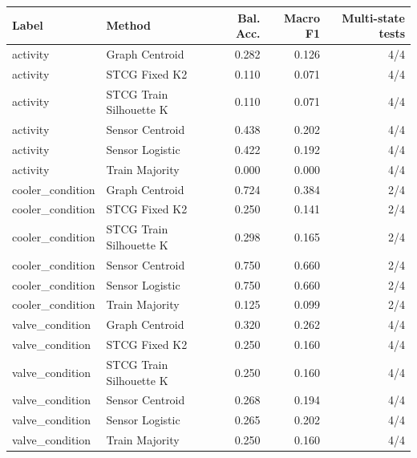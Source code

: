 \begin{tabular}{llrrr}
\toprule
Label & Method & Bal. Acc. & Macro F1 & Multi-state tests \\
\midrule
activity & Graph Centroid & 0.282 & 0.126 & 4/4 \\
activity & STCG Fixed K2 & 0.110 & 0.071 & 4/4 \\
activity & STCG Train Silhouette K & 0.110 & 0.071 & 4/4 \\
activity & Sensor Centroid & 0.438 & 0.202 & 4/4 \\
activity & Sensor Logistic & 0.422 & 0.192 & 4/4 \\
activity & Train Majority & 0.000 & 0.000 & 4/4 \\
cooler\_condition & Graph Centroid & 0.724 & 0.384 & 2/4 \\
cooler\_condition & STCG Fixed K2 & 0.250 & 0.141 & 2/4 \\
cooler\_condition & STCG Train Silhouette K & 0.298 & 0.165 & 2/4 \\
cooler\_condition & Sensor Centroid & 0.750 & 0.660 & 2/4 \\
cooler\_condition & Sensor Logistic & 0.750 & 0.660 & 2/4 \\
cooler\_condition & Train Majority & 0.125 & 0.099 & 2/4 \\
valve\_condition & Graph Centroid & 0.320 & 0.262 & 4/4 \\
valve\_condition & STCG Fixed K2 & 0.250 & 0.160 & 4/4 \\
valve\_condition & STCG Train Silhouette K & 0.250 & 0.160 & 4/4 \\
valve\_condition & Sensor Centroid & 0.268 & 0.194 & 4/4 \\
valve\_condition & Sensor Logistic & 0.265 & 0.202 & 4/4 \\
valve\_condition & Train Majority & 0.250 & 0.160 & 4/4 \\
\bottomrule
\end{tabular}

